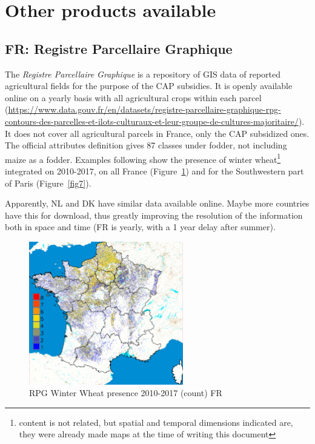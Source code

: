\documentclass[a4paper,11.5pt,onecolumn]{article}
\begin{document}
\section{Other products available}
\subsection{FR: Registre Parcellaire Graphique}
The \textit{Registre Parcellaire Graphique} is a repository of GIS data of reported agricultural fields for the purpose of the CAP subsidies. It is openly available online on a yearly basis with all agricultural crops within each parcel (\href{https://www.data.gouv.fr/en/datasets/registre-parcellaire-graphique-rpg-contours-des-parcelles-et-ilots-culturaux-et-leur-groupe-de-cultures-majoritaire/}{https://www.data.gouv.fr/en/datasets/registre-parcellaire-graphique-rpg-contours-des-parcelles-et-ilots-culturaux-et-leur-groupe-de-cultures-majoritaire/}). It does not cover all agricultural parcels in France, only the CAP subsidized ones. The official attributes definition gives 87 classes under fodder, not including maize as a fodder. Examples following show the presence of winter wheat\footnote{content is not related, but spatial and temporal dimensions indicated are, they were already made maps at the time of writing this document} integrated on 2010-2017, on all France (Figure~\ref{fig6}) and for the Southwestern part of Paris (Figure~\ref{fig7}).\newline\linebreak

\noindent Apparently, NL and DK have similar data available online. Maybe more countries have this for download, thus greatly improving the resolution of the information both in space and time (FR is yearly, with a 1 year delay after summer). 

\begin{figure}[htbp]
\begin{center}
\includegraphics[width=0.60\textwidth]{images/RPG.png}
\caption{RPG Winter Wheat presence 2010-2017 (count) FR}
\end{center}
\label{fig6}
\end{figure}
\end{document}
